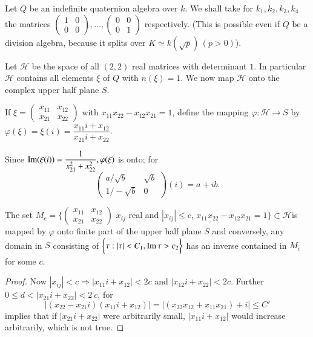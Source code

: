 Let $Q$ be an indefinite quaternion algebra over $k$. We shall take
for $k_1,  k_2,  k_3,  k_4$ the matrices $\begin{pmatrix}1 & 0 \\ 0 &
  0 \end{pmatrix}, \ldots, \begin{pmatrix} 0 & 0 \\ 0 &
  1 \end{pmatrix}$ respectively. (This is possible even if $Q$ be a
division algebra, because it splits over $K \simeq k (\sqrt{p})\, (p >
0)$).  
 
Let $\mathscr{H}$ be the space of all $(2, 2)$ real matrices with
determinant $1$. In particular $\mathscr{H}$ contains all elements
$\xi$ of $Q$ with $n (\xi) = 1$. We now map $\mathscr{H}$ onto the
complex upper half plane $S$.  

If $\xi = \begin{pmatrix} x_{11} & x_{12} \\ x_{21} &
  x_{22}\end{pmatrix}$ with $x_{11} x_{22} - x_{12} x_{21} = 1$,
define the mapping $\varphi : \mathscr{H} \to S$ by $\varphi (\xi) =
\xi(i) = \dfrac{x_{11} i + x_{12}}{x_{21 } i + x_{22}}$.  

 Since $\operatorname{Im}  (\xi(i)) = \dfrac{1}{x^{2}_{21} + x^{2}_{22}},
 \varphi(\xi)$ is onto; for
\begin{equation*}
  \begin{pmatrix}
    a / \sqrt{b} & \sqrt{b} \\ 1 / -\sqrt{b} & 0
  \end{pmatrix}
  (i) = a + ib. 
\end{equation*}

\begin{Lemma}\label{chap2:sec4:lem4} %
  The set $M_c = \bigg\{ \begin{pmatrix} x_{11} & x_{12} \\ x_{21} &
    x_{22}\end{pmatrix}$ $x_{ij}$ real and $|x_{ij}| \leq c$, $x_{11}
    x_{22}- x_{12} x_{21}= 1 \bigg \} \subset \mathscr{H}$\pageoriginale is mapped
    by $\varphi$ onto finite part of the upper half plane $S$ and
    conversely, any domain in $S$ consisting of $\bigg\{ \tau : |\tau|
    < C_1, \operatorname{Im}  \tau > c_2 \bigg \}$ has an inverse contained in $M_c$
    for some $c$.  
 \end{Lemma}  

\begin{proof}
  Now $|x_{ij}| < c \Longrightarrow |x_{11} i + x_{12}| < 2c $ and
  $|x_{12} i + x_{22}|< 2c$. Further $0 \leq d < |x_{21} i + x_{22} |<
  2 ~ c$, for 
  $$
  \big| (x_{22} - x_{21} i ) (x_{11} i + x_{12}) \big| = \big|(x_{22}
  x_{12} + x_{11} x_{21}) + i \big| \leq C' 
  $$
  implies that if $\big|x_{21} i + x_{22}\big|$ were arbitrarily
  small, $|x_{11} i + x_{12}|$ would increase arbitrarily, which is
  not true.  
\end{proof} 

